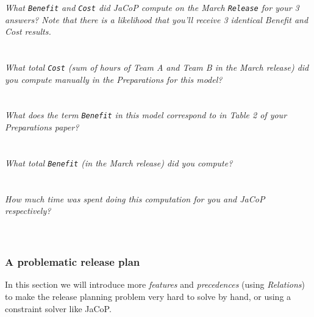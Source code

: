 \documentclass[11pt]{article}
\begin{document}
\noindent\textit{What \texttt{Benefit} and \texttt{Cost} did JaCoP compute on the March \texttt{Release} for your 3 answers? Note that there is a likelihood that you'll receive 3 identical Benefit and Cost results.}\\ \\
\underline{\hspace{0.9\textwidth}}\\

\noindent\textit{What total \texttt{Cost} (sum of hours of Team A and Team B in the March release) did you compute manually in the Preparations for this model?}\\ \\
\underline{\hspace{0.9\textwidth}}\\

\noindent\textit{What does the term \texttt{Benefit} in this model correspond to in Table 2 of your Preparations paper?}\\ \\
\underline{\hspace{0.9\textwidth}}\\

\noindent\textit{What total \texttt{Benefit} (in the March release) did you compute?}\\ \\
\underline{\hspace{0.9\textwidth}}\\

\noindent\textit{How much time was spent doing this computation for you and JaCoP respectively?}\\ \\
\underline{\hspace{0.9\textwidth}}\\


%
%
\subsubsection{A problematic release plan}
In this section we will introduce more \textit{features} and \textit{precedences} (using \textit{Relations}) to make the release planning problem very hard to solve by hand, or using a constraint solver like JaCoP.
\end{document}
